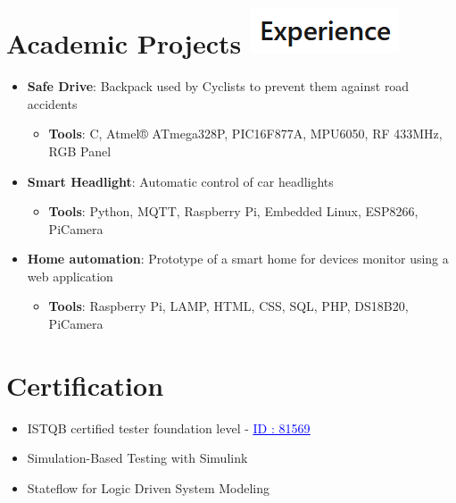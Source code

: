 \documentclass{my_cv}
\begin{document}
\section{Academic Projects  \hfill  {\small \href{https://www.linkedin.com/in/hamid-tasra-943700126/details/experience/}{\includegraphics[scale=0.75]{Capture.png}}}}


\begin{itemize}[leftmargin=10pt, itemsep=0pt]
\item {\bf Safe Drive}:  Backpack used by Cyclists to prevent them against road accidents
\begin{itemize}\vspace{-8pt}
\item {\bf Tools}: C, Atmel® ATmega328P, PIC16F877A, MPU6050, RF 433MHz, RGB Panel
\end{itemize}
\vspace{-4pt}
\item {\bf Smart Headlight}: Automatic control of car headlights  
\begin{itemize}\vspace{-8pt}
\item {\bf Tools}: Python, MQTT, Raspberry Pi, Embedded Linux, ESP8266, PiCamera
\end{itemize}
\vspace{-4pt}
\item {\bf Home automation}: Prototype of a smart home for devices monitor using a web application
\begin{itemize}\vspace{-8pt}
\item {\bf Tools}: Raspberry Pi, LAMP, HTML, CSS, SQL, PHP, DS18B20, PiCamera
\end{itemize}
\end{itemize}


\section{Certification}
	
\begin{itemize}[leftmargin=10pt, itemsep=0pt]
    \item ISTQB certified tester foundation level - \href{http://scr.istqb.org/?name=tasra&number=81569&orderBy=relevancy&orderDirection=&dateStart=&dateEnd=&expiryStart=&expiryEnd=&certificationBody=&examProvider=&certificationLevel=&country=}{\textcolor{blue}{\underline{ID : 81569}}}
 \item Simulation-Based Testing with Simulink
\item Stateflow for Logic Driven System Modeling
\end{itemize}
\end{document}
